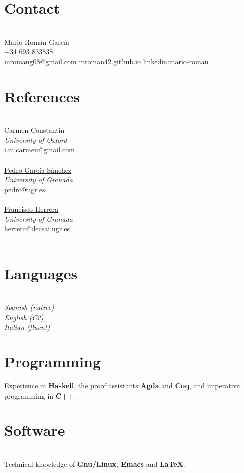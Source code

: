 \documentclass[nocolors]{friggeri-cv-a4}
\begin{document}

\begin{aside} %
  \section{Contact}\\
  Mario Román García\\
+34 693 833838\\
\href{mailto:mromang08@gmail.com}{mromang08@gmail.com}
\href{https://mroman42.github.io}{mroman42.github.io}
\href{https://www.linkedin.com/in/mario-roman}{linkedin:mario-roman}
\section{References}\\
Carmen Constantin\\
\textit{University of Oxford}\\
\href{mailto:i.m.carmen@gmail.com}{i.m.carmen@gmail.com}\\
\quad\\
\href{https://scholar.google.com/citations?user=gvq9UmMAAAAJ&hl=en&oi=ao}{Pedro García-Sánchez}\\
\textit{University of Granada}\\
\href{mailto:pedro@ugr.es}{pedro@ugr.es}\\
\quad\\
\href{https://scholar.google.com/citations?user=HULIk-QAAAAJ&hl=en&oi=sra}{Francisco Herrera}\\
\textit{University of Granada}\\
\href{mailto:herrera@decsai.ugr.es}{herrera@decsai.ugr.es}\\
\quad\\



\section{Languages}\\
\textit{Spanish (native)\\
English (C2) \\
Italian (fluent)}
\section{Programming}
{\small Experience in \textbf{Haskell},
  the proof assistants \textbf{Agda} and \textbf{Coq},
  and imperative programming in \textbf{C++}.
}

\section{Software}\\
{\small Technical knowledge of \textbf{Gnu/Linux},
  \textbf{Emacs} and \textbf{LaTeX}.
}
\end{aside}
\end{document}

